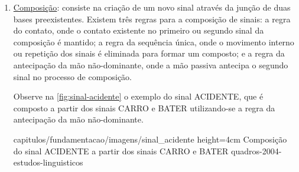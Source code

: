 \begin{enumerate}
\begin{enumerate}
              \item \underline{Composição}: consiste na criação de um novo sinal através da junção de duas bases preexistentes.
                    Existem três regras para a composição de sinais: a regra do contato, onde o contato existente no primeiro ou segundo sinal da composição é mantido; a regra da sequência única, onde o movimento interno ou repetição dos sinais é eliminada para formar um composto; e a regra da antecipação da mão não-dominante, onde a mão passiva antecipa o segundo sinal no processo de composição.

                    Observe na \autoref{fig:sinal-acidente} o exemplo do sinal ACIDENTE, que é composto a partir dos sinais CARRO e BATER utilizando-se a regra da antecipação da mão não-dominante.



                    {capitulos/fundamentacao/imagens/sinal_acidente} %
                    {height=4cm} %
                    {Composição do sinal ACIDENTE a partir dos sinais CARRO e BATER} %
                    {quadros-2004-estudos-linguisticos} %






\end{enumerate}
\end{enumerate}
